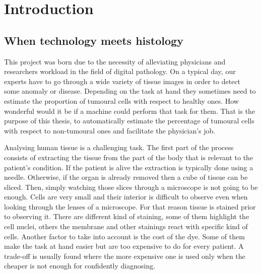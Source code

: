 \chapter{Introduction}
\section{When technology meets histology}

This project was born due to the necessity of alleviating physicians and researchers workload in the field of digital pathology. On a typical day, our experts have to go through a wide variety of tissue images in order to detect some anomaly or disease. Depending on the task at hand they sometimes need to estimate the proportion of tumoural cells with respect to healthy ones. How wonderful would it be if a machine could perform that task for them. That is the purpose of this thesis, to automatically estimate the percentage of tumoural cells with respect to non-tumoural ones and facilitate the physician's job.

Analysing human tissue is a challenging task. The first part of the process consists of extracting the tissue from the part of the body that is relevant to the patient's condition. If the patient is alive the extraction is typically done using a needle. Otherwise, if the organ is already removed then a cube of tissue can be sliced. Then, simply watching those slices through a microscope is not going to be enough. Cells are very small and their interior is difficult to observe even when looking through the lenses of a microscope. For that reason tissue is stained prior to observing it. There are different kind of staining, some of them highlight the cell nuclei, others the membrane and other stainings react with specific kind of cells. Another factor to take into account is the cost of the dye. Some of them make the task at hand easier but are too expensive to do for every patient. A trade-off is usually found where the more expensive one is used only when the cheaper is not enough for confidently diagnosing.

